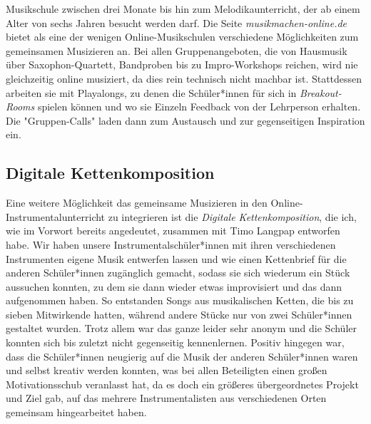 Musikschule zwischen drei Monate bis hin zum Melodikaunterricht, der ab einem
Alter von sechs Jahren besucht werden darf. \autocite{online_musikschule_emp}
Die Seite \emph{musikmachen-online.de} bietet als eine der wenigen
Online-Musikschulen verschiedene Möglichkeiten zum gemeinsamen Musizieren an.
\autocite{online_musikschule_mmo} Bei allen Gruppenangeboten, die von Hausmusik
über Saxophon-Quartett, Bandproben bis zu Impro-Workshops reichen, wird nie
gleichzeitig online musiziert, da dies rein technisch nicht machbar ist.
Stattdessen arbeiten sie mit Playalongs, zu denen die Schüler*innen für sich in
\emph{Breakout-Rooms} spielen können und wo sie Einzeln Feedback von der
Lehrperson erhalten. Die "Gruppen-Calls" laden dann zum Austausch und zur
gegenseitigen Inspiration ein. \autocite{online_musikschule_mmo}


\subsection{Digitale Kettenkomposition}
Eine weitere Möglichkeit das gemeinsame Musizieren in den
Online-Instrumentalunterricht zu integrieren ist die \emph{Digitale
Kettenkomposition}, die ich, wie im Vorwort bereits angedeutet, zusammen mit
Timo Langpap entworfen habe. Wir haben unsere Instrumentalschüler*innen mit
ihren verschiedenen Instrumenten eigene Musik entwerfen lassen und wie einen
Kettenbrief für die anderen Schüler*innen zugänglich gemacht, sodass sie sich
wiederum ein Stück aussuchen konnten, zu dem sie dann wieder etwas improvisiert
und das dann aufgenommen haben. So entstanden Songs aus musikalischen Ketten,
die bis zu sieben Mitwirkende hatten, während andere Stücke nur von zwei
Schüler*innen gestaltet wurden. Trotz allem war das ganze leider sehr anonym und
die Schüler konnten sich bis zuletzt nicht gegenseitig kennenlernen. Positiv
hingegen war, dass die Schüler*innen neugierig auf die Musik der anderen
Schüler*innen waren und selbst kreativ werden konnten, was bei allen Beteiligten
einen großen Motivationsschub veranlasst hat, da es doch ein größeres
übergeordnetes Projekt und Ziel gab, auf das mehrere Instrumentalisten aus
verschiedenen Orten gemeinsam hingearbeitet haben. 

